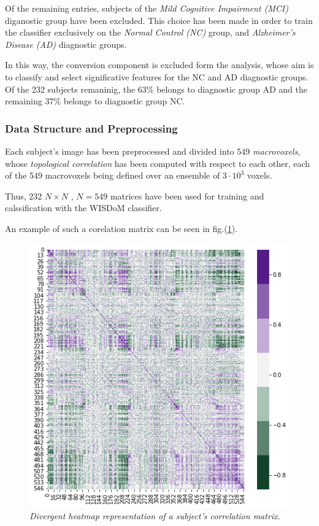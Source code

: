\documentclass[12pt,openright,twoside,a4paper]{book}
\begin{document}
Of the remaining entries, subjects of the \textit{Mild Cognitive Impairment (MCI)} diganostic group have been excluded.
This choice has been made in order to train the classifier exclusively on the \textit{Normal Control (NC)} group, and \textit{Alzheimer's Disease (AD)} diagnostic groups.

In this way, the conversion component is excluded form the analysis, whose aim is to classify and select significative features for the NC and AD diagnostic groups.
Of the 232 subjects remaninig, the 63\% belongs to diagnostic group AD and the remaining 37\% belongs to diagnostic group NC.

\subsubsection*{Data Structure and Preprocessing}

Each subject's image has been preprocessed and divided into 549 \textit{macrovoxels}, whose \textit{topological correlation} has been computed with respect to each other, each of the 549 macrovoxels being defined over an ensemble of $3 \cdot 10^3$ voxels.

Thus, 232 $N\times N$ , $N=549$ matrices have been used for training and calssification with the WISDoM classifier.

An example of such a corelation matrix can be seen in fig.(\ref{sample-heat}).

\begin{figure}[!h]
\centering
\includegraphics[scale=0.5]{sample-heat}
\caption{\textit{Divergent heatmap representation of a subject's correlation matrix.}}
\label{sample-heat}
\end{figure}
\end{document}
